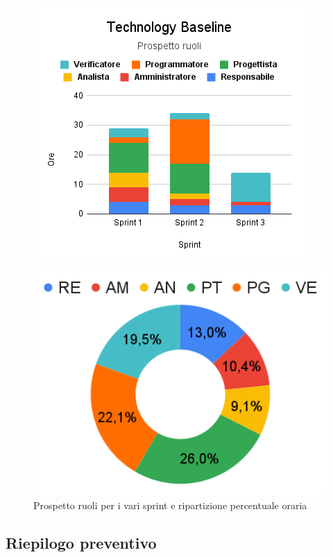 \begin{figure}[h!]
	\centering
	\begin{minipage}[c]{0.4\textwidth}
    	\includegraphics[scale=0.6]{../../assets/Diagrammi_Excel/Technology Baseline.png}
	\end{minipage}
\hfill
	\begin{minipage}[c]{0.4\textwidth}
		\includegraphics[scale=0.5]{../../assets/Diagrammi_Excel/Rip_tec.png}
	\end{minipage}
	\caption{Prospetto ruoli per i vari sprint e ripartizione percentuale oraria}
\end{figure}

\newpage
\subsection{Riepilogo preventivo}

